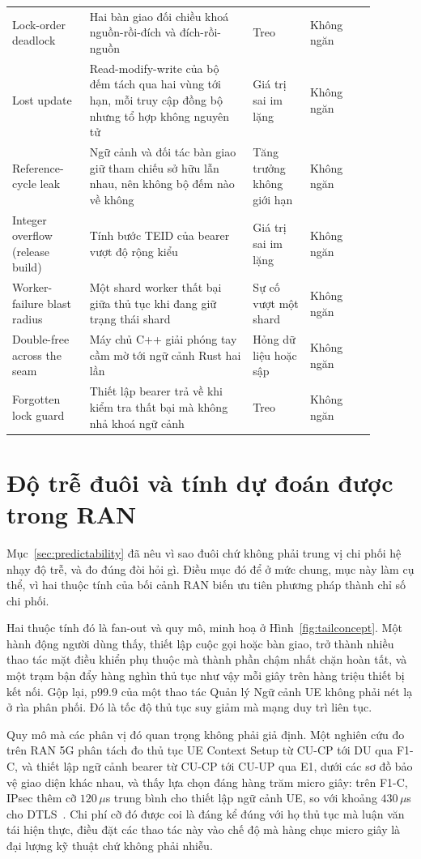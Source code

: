 \begin{table}[H]
\begin{tabular}{@{}R{0.19\linewidth} R{0.40\linewidth} R{0.14\linewidth} R{0.16\linewidth}@{}}
Lock-order deadlock & Hai bàn giao đối chiều khoá nguồn-rồi-đích và đích-rồi-nguồn & Treo & Không ngăn \\
Lost update & Read-modify-write của bộ đếm tách qua hai vùng tới hạn, mỗi truy cập đồng bộ nhưng tổ hợp không nguyên tử & Giá trị sai im lặng & Không ngăn \\
Reference-cycle leak & Ngữ cảnh và đối tác bàn giao giữ tham chiếu sở hữu lẫn nhau, nên không bộ đếm nào về không & Tăng trưởng không giới hạn & Không ngăn \\
Integer overflow (release build) & Tính bước TEID của bearer vượt độ rộng kiểu & Giá trị sai im lặng & Không ngăn \\
Worker-failure blast radius & Một shard worker thất bại giữa thủ tục khi đang giữ trạng thái shard & Sự cố vượt một shard & Không ngăn \\
Double-free across the seam & Máy chủ C++ giải phóng tay cầm mờ tới ngữ cảnh Rust hai lần & Hỏng dữ liệu hoặc sập & Không ngăn \\
Forgotten lock guard & Thiết lập bearer trả về khi kiểm tra thất bại mà không nhả khoá ngữ cảnh & Treo & Không ngăn \\
\hline
\end{tabular}
\end{table}

\section{Độ trễ đuôi và tính dự đoán được trong RAN}
Mục~\ref{sec:predictability} đã nêu vì sao đuôi chứ không phải trung vị chi phối hệ nhạy độ trễ,
và đo đúng đòi hỏi gì. Điều mục đó để ở mức chung, mục này làm cụ thể, vì hai thuộc tính của bối
cảnh RAN biến ưu tiên phương pháp thành chỉ số chi phối.

Hai thuộc tính đó là fan-out và quy mô, minh hoạ ở Hình~\ref{fig:tailconcept}. Một hành động
người dùng thấy, thiết lập cuộc gọi hoặc bàn giao, trở thành nhiều thao tác mặt điều khiển phụ
thuộc mà thành phần chậm nhất chặn hoàn tất, và một trạm bận đẩy hàng nghìn thủ tục như vậy mỗi
giây trên hàng triệu thiết bị kết nối. Gộp lại, p99.9 của một thao tác Quản lý Ngữ cảnh UE không
phải nét lạ ở rìa phân phối. Đó là tốc độ thủ tục suy giảm mà mạng duy trì liên tục.

Quy mô mà các phân vị đó quan trọng không phải giả định. Một nghiên cứu đo trên RAN 5G phân tách
đo thủ tục UE Context Setup từ CU-CP tới DU qua F1-C, và thiết lập ngữ cảnh bearer từ CU-CP tới
CU-UP qua E1, dưới các sơ đồ bảo vệ giao diện khác nhau, và thấy lựa chọn đáng hàng trăm micro
giây: trên F1-C, IPsec thêm cỡ $120\,\mu$s trung bình cho thiết lập ngữ cảnh UE, so với khoảng
$430\,\mu$s cho DTLS~\cite{michaelides2026ranlatency}. Chi phí cỡ đó được coi là đáng kể đúng với
họ thủ tục mà luận văn tái hiện thực, điều đặt các thao tác này vào chế độ mà hàng chục micro giây
là đại lượng kỹ thuật chứ không phải nhiễu.

